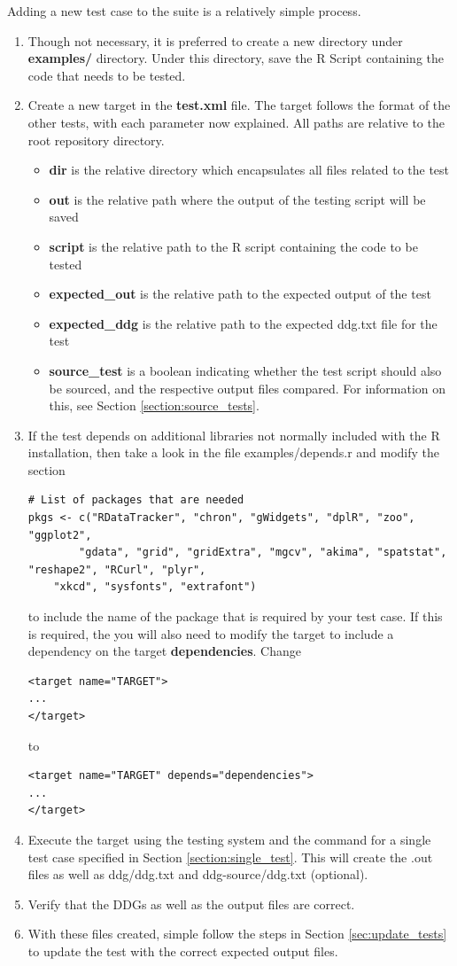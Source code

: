 \documentclass[12pt]{article}
\begin{document}
Adding a new test case to the suite is a relatively simple process. 
\begin{enumerate}
\item Though not necessary, it is preferred to create a new directory under \textbf{examples/} directory. Under this directory, save the R Script containing the code that needs to be tested.
\item Create a new target in the \textbf{test.xml} file. The target follows the format of the other tests, with each parameter now explained. All paths are relative to the root repository directory.
\begin{itemize}
\item \textbf{dir} is the relative directory which encapsulates all files related to the test
\item \textbf{out} is the relative path where the output of the testing script will be saved
\item \textbf{script} is the relative path to the R script containing the code to be tested
\item \textbf{expected\_out} is the relative path to the expected output of the test 
\item \textbf{expected\_ddg} is the relative path to the expected ddg.txt file for the test
\item \textbf{source\_test} is a boolean indicating whether the test script should also be sourced, and the respective output files compared. For information on this, see Section \ref{section:source_tests}.
\end{itemize}
\item If the test depends on additional libraries not normally included with the R installation, then take a look in the file examples/depends.r and modify the section 
\begin{lstlisting}
# List of packages that are needed 
pkgs <- c("RDataTracker", "chron", "gWidgets", "dplR", "zoo", "ggplot2",
		"gdata", "grid", "gridExtra", "mgcv", "akima", "spatstat", "reshape2", "RCurl", "plyr",
    "xkcd", "sysfonts", "extrafont")
\end{lstlisting}
to include the name of the package that is required by your test case. If this is required, the you will also need to modify the target to include a dependency on the target \textbf{dependencies}. Change
\begin{lstlisting}
<target name="TARGET">
...
</target>
\end{lstlisting}
to
\begin{lstlisting}
<target name="TARGET" depends="dependencies">
...
</target>
\end{lstlisting}
\item Execute the target using the testing system and the command for a single test case specified in Section \ref{section:single_test}. This will create the .out files as well as ddg/ddg.txt and ddg-source/ddg.txt (optional).
\item Verify that the DDGs as well as the output files are correct.
\item  With these files created, simple follow the steps in Section \ref{sec:update_tests} to update the test with the correct expected output files.
\end{enumerate}
\end{document}
